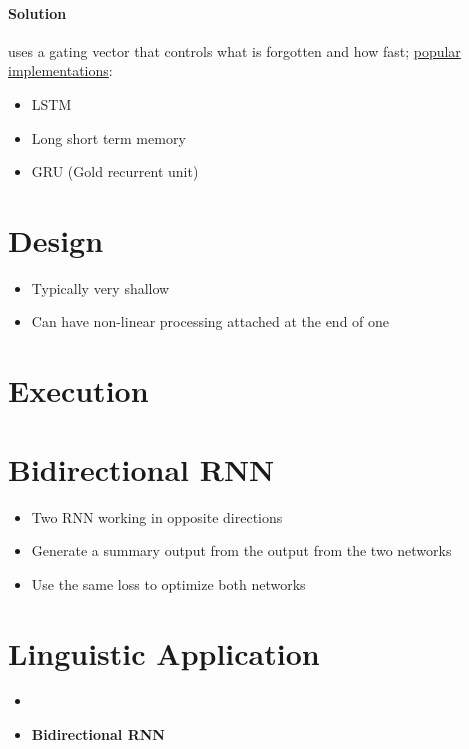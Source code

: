   \paragraph{Solution} uses a gating vector that controls what is
  forgotten and how fast; \ul{popular implementations}:
  \begin{itemize}
    \item LSTM
    \item Long short term memory
    \item GRU (Gold recurrent unit)
  \end{itemize}

\section{Design}

  \begin{itemize}
    \item Typically very shallow
    \item Can have non-linear processing attached at the end of one
  \end{itemize}

\section{Execution}

\section{Bidirectional RNN}

  \begin{itemize}
    \item Two RNN working in opposite directions
    \item Generate a summary output from the output from the two networks
    \item Use the same loss to optimize both networks
  \end{itemize}

\section{Linguistic Application}

  \begin{itemize}
    \item
    \item \textbf{Bidirectional RNN}
  \end{itemize}
